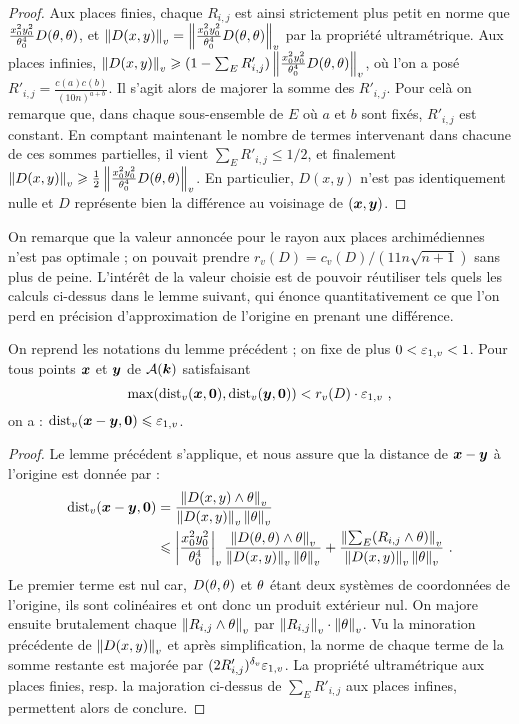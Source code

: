 \begin{proof}
  Aux places finies, chaque $R_{i, j}$ est ainsi strictement plus petit en
  norme que $\frac{x_0^2y_0^2}{\theta_0^4}D(\theta, \theta)$, et $\left\lVert D(x, y)\right\rVert_{v} =
  \left\lVert\frac{x_0^2y_0^2}{\theta_0^4}D(\theta, \theta)\right\rVert_{v}$ par la propriété
  ultramétrique.  Aux places infinies, $\left\lVert D(x, y)\right\rVert_{v} \geqslant (1-\sum_E R'_{i, j})
  \left\lVert\frac{x_0^2y_0^2}{\theta_0^4}D(\theta, \theta)\right\rVert_{v}$, où l'on a posé $R'_{i, j} =
  \frac{c(a)c(b)}{ \left( 10n \right)^{a+b}}$. Il s'agit alors de majorer la
  somme des $R'_{i, j}$. Pour celà on remarque que, dans chaque sous-ensemble
  de $E$ où $a$ et $b$ sont fixés, $R'_{i, j}$ est constant. En comptant
  maintenant le nombre de termes intervenant dans chacune de ces sommes
  partielles, il vient $\sum_E R'_{i, j} \le 1/2$, et finalement $\left\lVert D(x, y)\right\rVert_{v}
  \geqslant \frac{1}{2} \left\lVert\frac{x_0^2y_0^2}{\theta_0^4}D(\theta, \theta)\right\rVert_{v}$. En
  particulier, $D(x, y)$ n'est pas identiquement nulle et $D$ représente bien
  la différence au voisinage de $({\boldsymbol{x}}, {\boldsymbol{y}})$.
\end{proof}

On remarque que la valeur annoncée pour le rayon aux places archimédiennes
n'est pas optimale ; on pouvait prendre $r_v(D) = c_v(D)/(11n\sqrt{n+1})$ sans
plus de peine. L'intérêt de la valeur choisie est de pouvoir réutiliser tels
quels les calculs ci-dessus dans le lemme suivant, qui énonce quantitativement
ce que l'on perd en précision d'approximation de l'origine en prenant une
différence.

\begin{lem} \label{DistRel}
  On reprend les notations du lemme précédent ; on fixe de plus $0 < \varepsilon_{1,
  v} < 1$. Pour tous points ${\boldsymbol{x}}$ et ${\boldsymbol{y}}$ de $\mathcal{A}(\boldsymbol{k})$ satisfaisant
  \[
  \max ( \mathrm{dist}_v({\boldsymbol{x}}, {\boldsymbol{0}}), \mathrm{dist}_v({\boldsymbol{y}}, {\boldsymbol{0}}) ) < r_v(D) \cdot \varepsilon_{1,v} \text{ ,}
  \]
  on a : $\mathrm{dist}_v({\boldsymbol{x}}-{\boldsymbol{y}}, {\boldsymbol{0}}) \leqslant \varepsilon_{1,v}$.
\end{lem}


\begin{proof}
  Le lemme précédent s'applique, et nous assure que la distance de
  ${\boldsymbol{x}}-{\boldsymbol{y}}$ à l'origine  est donnée par :
  \begin{align*}
  \mathrm{dist}_v({\boldsymbol{x}}-{\boldsymbol{y}}, {\boldsymbol{0}}) & = \frac{\left\lVert D(x, y) \wedge \theta\right\rVert_{v}}{\left\lVert D(x,
    y)\right\rVert_{v}\left\lVert\theta\right\rVert_{v}} \\
  & \leqslant \left\lvert\frac{x_0^2y_0^2}{\theta_0^4}\right\rvert_{v}\frac{\left\lVert D(\theta, \theta)\wedge
    \theta\right\rVert_{v}}{\left\lVert D(x, y)\right\rVert_{v}\left\lVert\theta\right\rVert_{v}} + \frac{\left\lVert\sum_E (R_{i, j} \wedge
    \theta)\right\rVert_{v}}{\left\lVert D(x, y)\right\rVert_{v}\left\lVert\theta\right\rVert_{v}} \text{ .}
  \end{align*}
  Le premier terme est nul car, $D(\theta, \theta)$ et $\theta$ étant deux systèmes
  de coordonnées de l'origine, ils sont colinéaires et ont donc un produit
  extérieur nul. On majore ensuite brutalement chaque $\left\lVert R_{i, j} \wedge
    \theta\right\rVert_{v}$ par $\left\lVert R_{i, j}\right\rVert_{v} \cdot \left\lVert\theta\right\rVert_{v}$. Vu la minoration précédente de
  $\left\lVert D(x, y)\right\rVert_{v}$ et après simplification, la norme de chaque terme de la somme
  restante est majorée par $(2R'_{i, j})^{\delta_v} \varepsilon_{1, v}$. La propriété
  ultramétrique aux places finies, resp. la majoration ci-dessus de $\sum_E
  R'_{i, j}$ aux places infines, permettent alors de conclure.
\end{proof}

